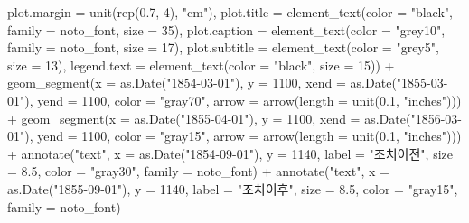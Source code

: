 \documentclass[
  letterpaper,
  chapter,a4paper,showtrims,openright,hidelinks]{oblivoir}
\newenvironment{Shaded}{\begin{snugshade}}{\end{snugshade}}
\newcommand{\AttributeTok}[1]{\textcolor[rgb]{0.40,0.45,0.13}{#1}}
\newcommand{\DecValTok}[1]{\textcolor[rgb]{0.68,0.00,0.00}{#1}}
\newcommand{\FloatTok}[1]{\textcolor[rgb]{0.68,0.00,0.00}{#1}}
\newcommand{\FunctionTok}[1]{\textcolor[rgb]{0.28,0.35,0.67}{#1}}
\newcommand{\NormalTok}[1]{\textcolor[rgb]{0.00,0.23,0.31}{#1}}
\newcommand{\SpecialCharTok}[1]{\textcolor[rgb]{0.37,0.37,0.37}{#1}}
\newcommand{\StringTok}[1]{\textcolor[rgb]{0.13,0.47,0.30}{#1}}
\begin{document}
\begin{Shaded}
\begin{Highlighting}[]
          \AttributeTok{plot.margin =} \FunctionTok{unit}\NormalTok{(}\FunctionTok{rep}\NormalTok{(}\FloatTok{0.7}\NormalTok{, }\DecValTok{4}\NormalTok{), }\StringTok{"cm"}\NormalTok{),}
          \AttributeTok{plot.title =} \FunctionTok{element\_text}\NormalTok{(}\AttributeTok{color =} \StringTok{"black"}\NormalTok{, }\AttributeTok{family =}\NormalTok{ noto\_font, }\AttributeTok{size =} \DecValTok{35}\NormalTok{),}
          \AttributeTok{plot.caption =} \FunctionTok{element\_text}\NormalTok{(}\AttributeTok{color =} \StringTok{"grey10"}\NormalTok{, }\AttributeTok{family =}\NormalTok{ noto\_font, }\AttributeTok{size =} \DecValTok{17}\NormalTok{),}
          \AttributeTok{plot.subtitle =} \FunctionTok{element\_text}\NormalTok{(}\AttributeTok{color =} \StringTok{"grey5"}\NormalTok{, }\AttributeTok{size =} \DecValTok{13}\NormalTok{),}
          \AttributeTok{legend.text =} \FunctionTok{element\_text}\NormalTok{(}\AttributeTok{color =} \StringTok{"black"}\NormalTok{, }\AttributeTok{size =} \DecValTok{15}\NormalTok{)) }\SpecialCharTok{+}
    \FunctionTok{geom\_segment}\NormalTok{(}\AttributeTok{x =} \FunctionTok{as.Date}\NormalTok{(}\StringTok{"1854{-}03{-}01"}\NormalTok{), }\AttributeTok{y =} \DecValTok{1100}\NormalTok{,}
                 \AttributeTok{xend =} \FunctionTok{as.Date}\NormalTok{(}\StringTok{"1855{-}03{-}01"}\NormalTok{), }\AttributeTok{yend =} \DecValTok{1100}\NormalTok{,}
                 \AttributeTok{color =} \StringTok{"gray70"}\NormalTok{,}
                 \AttributeTok{arrow =} \FunctionTok{arrow}\NormalTok{(}\AttributeTok{length =} \FunctionTok{unit}\NormalTok{(}\FloatTok{0.1}\NormalTok{, }\StringTok{"inches"}\NormalTok{))) }\SpecialCharTok{+}
    \FunctionTok{geom\_segment}\NormalTok{(}\AttributeTok{x =} \FunctionTok{as.Date}\NormalTok{(}\StringTok{"1855{-}04{-}01"}\NormalTok{), }\AttributeTok{y =} \DecValTok{1100}\NormalTok{,}
                 \AttributeTok{xend =} \FunctionTok{as.Date}\NormalTok{(}\StringTok{"1856{-}03{-}01"}\NormalTok{), }\AttributeTok{yend =} \DecValTok{1100}\NormalTok{,}
                 \AttributeTok{color =} \StringTok{"gray15"}\NormalTok{,}
                 \AttributeTok{arrow =} \FunctionTok{arrow}\NormalTok{(}\AttributeTok{length =} \FunctionTok{unit}\NormalTok{(}\FloatTok{0.1}\NormalTok{, }\StringTok{"inches"}\NormalTok{))) }\SpecialCharTok{+}
    \FunctionTok{annotate}\NormalTok{(}\StringTok{"text"}\NormalTok{, }\AttributeTok{x =} \FunctionTok{as.Date}\NormalTok{(}\StringTok{"1854{-}09{-}01"}\NormalTok{), }\AttributeTok{y =} \DecValTok{1140}\NormalTok{, }\AttributeTok{label =} \StringTok{"조치이전"}\NormalTok{,}
             \AttributeTok{size =} \FloatTok{8.5}\NormalTok{, }\AttributeTok{color =} \StringTok{"gray30"}\NormalTok{, }\AttributeTok{family =}\NormalTok{ noto\_font) }\SpecialCharTok{+}
    \FunctionTok{annotate}\NormalTok{(}\StringTok{"text"}\NormalTok{, }\AttributeTok{x =} \FunctionTok{as.Date}\NormalTok{(}\StringTok{"1855{-}09{-}01"}\NormalTok{), }\AttributeTok{y =} \DecValTok{1140}\NormalTok{, }\AttributeTok{label =} \StringTok{"조치이후"}\NormalTok{,}
             \AttributeTok{size =} \FloatTok{8.5}\NormalTok{, }\AttributeTok{color =} \StringTok{"gray15"}\NormalTok{, }\AttributeTok{family =}\NormalTok{ noto\_font)          }


\end{Highlighting}
\end{Shaded}
\end{document}
